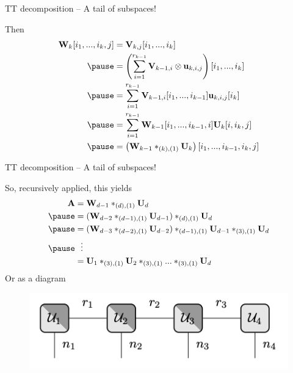 \documentclass{beamer}
\newcommand{\bvec}[1]{\mathbf{#1}}
\newcommand{\vu}{\bvec{u}}
\newcommand{\vA}{\bvec{A}}
\newcommand{\vU}{\bvec{U}}
\newcommand{\vV}{\bvec{V}}
\newcommand{\vW}{\bvec{W}}
\begin{document}
\begin{frame}{TT decomposition -- A tail of subspaces!}

Then
$$
\begin{aligned}
\vW_k[i_1,...,i_k,j] 
&=
\vV_{k,j}[i_1,...,i_k]\\\pause
&=
\left(\sum_{i=1}^{r_{k-1}} \vV_{k-1,i}\otimes \vu_{k,i,j}\right) [i_1,...,i_k]\\\pause
&=
\sum_{i=1}^{r_{k-1}} \vV_{k-1,i}[i_1,...,i_{k-1}]\vu_{k,i,j}[i_k]\\\pause
&=
\sum_{i=1}^{r_{k-1}} \vW_{k-1}[i_1,...,i_{k-1},i]\vU_{k}[i,i_k,j]\\\pause
&=
\left(
\vW_{k-1}*_{(k),(1)}\vU_k
\right) [i_1,...,i_{k-1},i_k,j]
\end{aligned}
$$
\end{frame}

\begin{frame}{TT decomposition -- A tail of subspaces!}

So, recursively applied, this yields
$$
\begin{aligned}
\vA 
&= 
\vW_{d-1}*_{(d),(1)}\vU_d\\ \pause
&=
(\vW_{d-2}*_{(d-1),(1)}\vU_{d-1})*_{(d),(1)}\vU_d\\ \pause
&=
(\vW_{d-3}*_{(d-2),(1)}  \vU_{d-2})*_{(d-1),(1)} \vU_{d-1}*_{(3),(1)}\vU_d
\\ \pause
&~~\vdots \\
&=
\vU_1 *_{(3),(1)} \vU_2 *_{(3),(1)} ... *_{(3),(1)} \vU_d
\end{aligned}
$$
\pause
Or as a diagram
\begin{figure}
    \centering
    \includegraphics[width = .5\textwidth]{Graphics/TTDecomposition.png}
\end{figure}
\end{frame}
\end{document}
